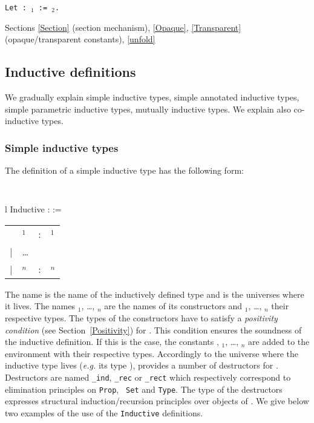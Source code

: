 \begin{ErrMsgs}
\item {}
\end{ErrMsgs}

\begin{Variants}
\item {\tt Let {\ident} : {\term$_1$} := {\term$_2$}.}
\end{Variants}

\SeeAlso Sections \ref{Section} (section mechanism), \ref{Opaque},
\ref{Transparent} (opaque/transparent constants), \ref{unfold}

\subsection{Inductive definitions
\label{gal_Inductive_Definitions}
\label{Inductive}}

We gradually explain simple inductive types, simple
annotated inductive types, simple parametric inductive types, 
mutually inductive types. We explain also co-inductive types.

\subsubsection{Simple inductive types}

The definition of a simple inductive type has the following form:

\medskip
{\tt 
\begin{tabular}{l}
Inductive {\ident} : {\sort} :=  \\
\begin{tabular}{clcl}
   & {\ident$_1$}  &:& {\type$_1$} \\
 | & {\ldots} && \\
 | & {\ident$_n$} &:& {\type$_n$}
\end{tabular}
\end{tabular}
}
\medskip

The name {\ident} is the name of the inductively defined type and
{\sort} is the universes where it lives.
The names {\ident$_1$}, {\ldots}, {\ident$_n$}
are the names of its constructors and {\type$_1$}, {\ldots},
{\type$_n$} their respective types. The types of the constructors have
to satisfy a {\em positivity condition} (see Section~\ref{Positivity})
for {\ident}.  This condition ensures the soundness of the inductive
definition.  If this is the case, the constants {\ident},
{\ident$_1$}, {\ldots}, {\ident$_n$} are added to the environment with
their respective types.  Accordingly to the universe where
the inductive type lives ({\it e.g.} its type {\sort}), {\Coq} provides a
number of destructors for {\ident}.  Destructors are named
{\ident}{\tt\_ind}, {\ident}{\tt \_rec} or {\ident}{\tt \_rect} which
respectively correspond to elimination principles on {\tt Prop}, {\tt
Set} and {\tt Type}.  The type of the destructors expresses structural
induction/recursion principles over objects of {\ident}. We give below
two examples of the use of the {\tt Inductive} definitions.

